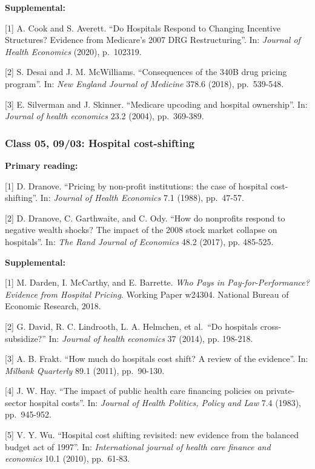 \documentclass[11pt,]{article}
\begin{document}
\textbf{Supplemental:}

{[}1{]} A. Cook and S. Averett. ``Do Hospitals Respond to Changing
Incentive Structures? Evidence from Medicare's 2007 DRG Restructuring''.
In: \emph{Journal of Health Economics} (2020), p.~102319.

{[}2{]} S. Desai and J. M. McWilliams. ``Consequences of the 340B drug
pricing program''. In: \emph{New England Journal of Medicine} 378.6
(2018), pp.~539-548.

{[}3{]} E. Silverman and J. Skinner. ``Medicare upcoding and hospital
ownership''. In: \emph{Journal of health economics} 23.2 (2004),
pp.~369-389.

\hypertarget{class-05-0903-hospital-cost-shifting}{%
\subsubsection{Class 05, 09/03: Hospital
cost-shifting}\label{class-05-0903-hospital-cost-shifting}}

\textbf{Primary reading:}

{[}1{]} D. Dranove. ``Pricing by non-profit institutions: the case of
hospital cost-shifting''. In: \emph{Journal of Health Economics} 7.1
(1988), pp.~47-57.

{[}2{]} D. Dranove, C. Garthwaite, and C. Ody. ``How do nonprofits
respond to negative wealth shocks? The impact of the 2008 stock market
collapse on hospitals''. In: \emph{The Rand Journal of Economics} 48.2
(2017), pp. 485-525.

\textbf{Supplemental:}

{[}1{]} M. Darden, I. McCarthy, and E. Barrette. \emph{Who Pays in
Pay-for-Performance? Evidence from Hospital Pricing}. Working Paper
w24304. National Bureau of Economic Research, 2018.

{[}2{]} G. David, R. C. Lindrooth, L. A. Helmchen, et al.~``Do hospitals
cross-subsidize?'' In: \emph{Journal of health economics} 37 (2014), pp.
198-218.

{[}3{]} A. B. Frakt. ``How much do hospitals cost shift? A review of the
evidence''. In: \emph{Milbank Quarterly} 89.1 (2011), pp.~90-130.

{[}4{]} J. W. Hay. ``The impact of public health care financing policies
on private-sector hospital costs''. In: \emph{Journal of Health
Politics, Policy and Law} 7.4 (1983), pp.~945-952.

{[}5{]} V. Y. Wu. ``Hospital cost shifting revisited: new evidence from
the balanced budget act of 1997''. In: \emph{International journal of
health care finance and economics} 10.1 (2010), pp.~61-83.
\end{document}
